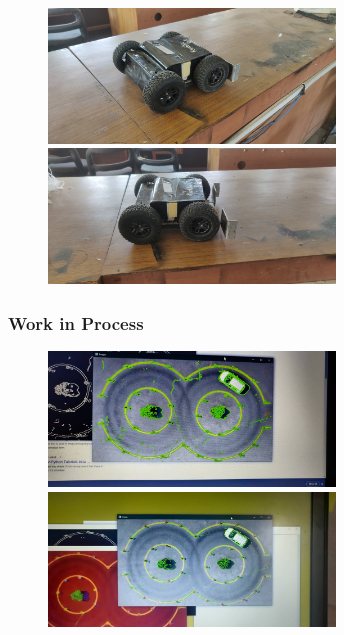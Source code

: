 \begin{figure}[!tbh] %
	\includegraphics[width = 3in]{images/botpid7.jpg}
	\hspace{.5cm}
	\includegraphics[width = 3in]{images/botpic8.jpg}
	\label{figSample1} %
\end{figure}



\subsubsection{Work in Process}
\begin{figure}[!tbh] %
	\includegraphics[width = 3in]{images/work in process1.jpg} 
	\hspace{.5cm}
	\includegraphics[width = 3in]{images/work in process2.jpg} 
	\label{figSample1} %
\end{figure}


